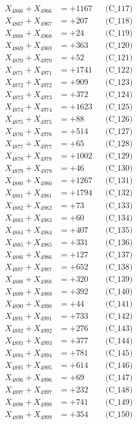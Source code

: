 \documentclass[a4paper,10pt]{article}
\begin{document}
{\begin{align}
X_{4866} + X_{4966} &= +1167 && \text{(C\_117)} \\
X_{4867} + X_{4967} &= +207 && \text{(C\_118)} \\
X_{4868} + X_{4968} &= +24 && \text{(C\_119)} \\
X_{4869} + X_{4969} &= +363 && \text{(C\_120)} \\
\allowbreak
X_{4870} + X_{4970} &= +52 && \text{(C\_121)} \\
X_{4871} + X_{4971} &= +1741 && \text{(C\_122)} \\
X_{4872} + X_{4972} &= +909 && \text{(C\_123)} \\
X_{4873} + X_{4973} &= +372 && \text{(C\_124)} \\
X_{4874} + X_{4974} &= +1623 && \text{(C\_125)} \\
\allowbreak
X_{4875} + X_{4975} &= +88 && \text{(C\_126)} \\
X_{4876} + X_{4976} &= +514 && \text{(C\_127)} \\
X_{4877} + X_{4977} &= +65 && \text{(C\_128)} \\
X_{4878} + X_{4978} &= +1002 && \text{(C\_129)} \\
X_{4879} + X_{4979} &= +46 && \text{(C\_130)} \\
\allowbreak
X_{4880} + X_{4980} &= +1267 && \text{(C\_131)} \\
X_{4881} + X_{4981} &= +1794 && \text{(C\_132)} \\
X_{4882} + X_{4982} &= +73 && \text{(C\_133)} \\
X_{4883} + X_{4983} &= +60 && \text{(C\_134)} \\
X_{4884} + X_{4984} &= +407 && \text{(C\_135)} \\
\allowbreak
X_{4885} + X_{4985} &= +331 && \text{(C\_136)} \\
X_{4886} + X_{4986} &= +127 && \text{(C\_137)} \\
X_{4887} + X_{4987} &= +652 && \text{(C\_138)} \\
X_{4888} + X_{4988} &= +320 && \text{(C\_139)} \\
X_{4889} + X_{4989} &= +392 && \text{(C\_140)} \\
\allowbreak
X_{4890} + X_{4990} &= +44 && \text{(C\_141)} \\
X_{4891} + X_{4991} &= +733 && \text{(C\_142)} \\
X_{4892} + X_{4992} &= +276 && \text{(C\_143)} \\
X_{4893} + X_{4993} &= +377 && \text{(C\_144)} \\
X_{4894} + X_{4994} &= +781 && \text{(C\_145)} \\
\allowbreak
X_{4895} + X_{4995} &= +614 && \text{(C\_146)} \\
X_{4896} + X_{4996} &= +69 && \text{(C\_147)} \\
X_{4897} + X_{4997} &= +232 && \text{(C\_148)} \\
X_{4898} + X_{4998} &= +741 && \text{(C\_149)} \\
X_{4899} + X_{4999} &= +354 && \text{(C\_150)} \\
\end{align}
}
\end{document}
